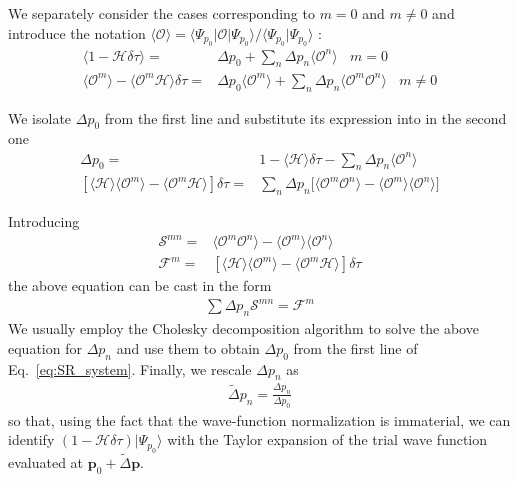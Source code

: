 \documentclass[a4paper,12pt,]{article}
\begin{document}
We separately consider the cases corresponding to $m=0$ and $m\neq 0$ and introduce the notation $\langle \mathcal{O} \rangle = \langle \Psi_{p_0}|\mathcal{O}|\Psi_{p_0}\rangle / \langle \Psi_{p_0}|\Psi_{p_0}\rangle$ :
\begin{align}
\langle 1-\mathcal{H}\delta \tau \rangle =& \Delta p_0 +\sum_n \Delta p_n \langle \mathcal{O}^n \rangle \ \ \ \ m=0\,\\
\langle \mathcal{O}^m \rangle - \langle \mathcal{O}^m \mathcal{H}\rangle \delta \tau=& \Delta p_0 \langle \mathcal{O}^m \rangle + \sum_n \Delta p_n \langle \mathcal{O}^m \mathcal{O}^n \rangle \ \ \ \ m\neq 0
\end{align}

We isolate $\Delta p_0$ from the first line and substitute its expression into in the second one
\begin{align} 
\Delta p_0 =& 1 -\langle \mathcal H \rangle \delta \tau -\sum_n \Delta p_n \langle \mathcal {O}^n \rangle\,\nonumber \\
[ \langle \mathcal{H}\rangle \langle \mathcal{O}^m \rangle - \langle \mathcal{O}^m \mathcal{H}\rangle] \delta \tau=& \sum_n \Delta p_n\Big[ \langle \mathcal{O}^m \mathcal{O}^n \rangle - \langle \mathcal{O}^m \rangle \langle \mathcal{O}^n \rangle \Big]
\label{eq:SR_system}
\end{align}

Introducing
\begin{align}
\mathcal{S}^{mn} =& \langle \mathcal{O}^m \mathcal{O}^n \rangle - \langle \mathcal{O}^m \rangle \langle \mathcal{O}^n \rangle \, \\
\mathcal{F}^m =& [\langle \mathcal{H}\rangle \langle \mathcal{O}^m \rangle - \langle \mathcal{O}^m \mathcal{H}\rangle]   \delta \tau
\end{align}
the above equation can be cast in the form
\begin{align}
\sum \Delta p_n  \mathcal{S}^{mn} = \mathcal{F}^m 
\end{align}
We usually employ the Cholesky decomposition algorithm to solve the above equation for  $\Delta p_n$ and use them to obtain $\Delta p_0$ from the first line of Eq.~\eqref{eq:SR_system}. Finally, we rescale $\Delta p_n$ as 
\begin{align}
\widetilde{\Delta} p_n = \frac{ \Delta p_n }{\Delta p_0}
\end{align}
so that, using the fact that the wave-function normalization is immaterial, we can identify $(1-\mathcal{H}\delta \tau) |\Psi_{p_0}\rangle$ with the Taylor expansion of the trial wave function evaluated at $\mathbf{p}_0 + \widetilde{\Delta} \mathbf{p}$. 
\end{document}

